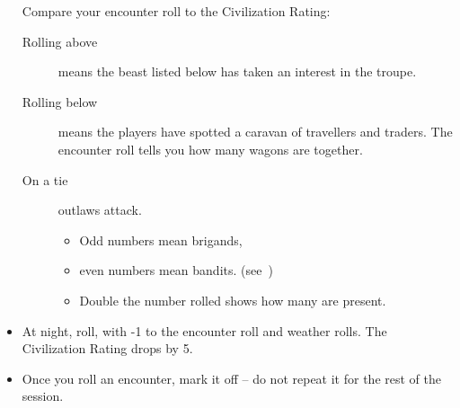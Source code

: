 \begin{multicols}{2}
\begin{itemize}
  Compare your encounter roll to the Civilization Rating:
  \begin{description}
    \item[Rolling above]
    means the beast listed below has taken an interest in the troupe.
    \item[Rolling below]
    means the players have spotted a caravan of travellers and traders.
    The encounter roll tells you how many wagons are together.
    \item[On a tie]
    outlaws attack.
    \begin{itemize}
      \item
      Odd numbers mean brigands,
      \item
      even numbers mean bandits.
      (see~)
      \item
      Double the number rolled shows how many are present.
    \end{itemize}
  \end{description}
  \item
  At night, roll, with -1 to the encounter roll and weather rolls.
  The Civilization Rating drops by 5.
  \item
  Once you roll an encounter, mark it off -- do not repeat it for the rest of the session.
\end{itemize}

\end{multicols}

\pagebreak

